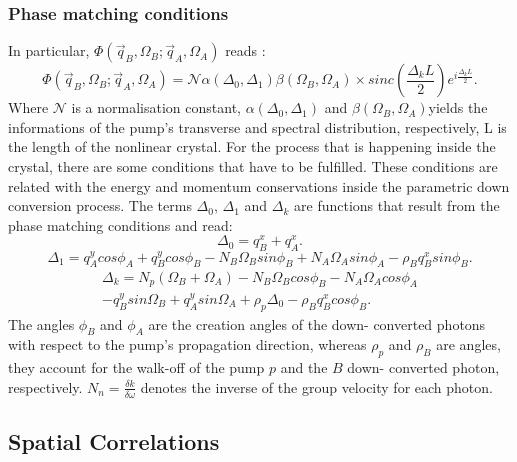 \subsubsection{Phase matching conditions}
In particular, $\Phi(\vec{q}_B,\Omega_B;\vec{q}_A,\Omega_A)$ reads \cite{omar}:
\begin{equation}
\label{eq:mode}
\Phi(\vec{q}_B,\Omega_B;\vec{q}_A,\Omega_A) = \mathcal{N} \alpha(\Delta_0,\Delta_1) \beta(\Omega_B,\Omega_A) \times
sinc \left( \frac{\Delta_k L}{2} \right) e^{i \frac{\Delta_k L}{2}}.
\end{equation}
Where $\mathcal{N}$ is a normalisation constant, $\alpha(\Delta_0,\Delta_1)$
and $\beta(\Omega_B,\Omega_A)$yields the informations of the pump's transverse 
and spectral distribution, respectively, L is the length of the nonlinear crystal.
For the process that is happening inside the crystal, there are some conditions that have to be fulfilled. These conditions are related with the energy and momentum conservations inside the parametric down conversion process.
The terms $\Delta_0$, $\Delta_1$ and $\Delta_k$ are functions that result from the phase matching conditions and read:
\begin{equation}
\Delta_0=q_B^x + q_A^x.
\end{equation}
\begin{equation}
\Delta_1= q_A^y cos\phi_A + q_B^y cos\phi_B - N_B \Omega_B sin\phi_B + N_A \Omega_A sin\phi_A - \rho_B q_B^x sin\phi_B .
\end{equation}
\begin{equation}
\begin{split}
\Delta_k=N_p(\Omega_B+\Omega_A)-N_B\Omega_B cos\phi_B - N_A\Omega_A cos\phi_A \\ -q_B^y sin\Omega_B + q_A^y sin\Omega_A + \rho_p \Delta_0 - \rho_B q_B^x cos\phi_B.
\end{split}
\end{equation}
The angles $\phi_B$ and $\phi_A$ are the creation angles of the down-
converted photons with respect to the pump’s
propagation direction, whereas $\rho_p$ and $\rho_B$ are angles, they account for
the walk-off of the pump $p$ and the $B$ down-
converted photon, respectively.  $N_n=\frac{\delta k}{\delta \omega}$ denotes the inverse of the group velocity for each photon.



\subsection{Spatial Correlations}\label{sec:spatialCorrelations}

